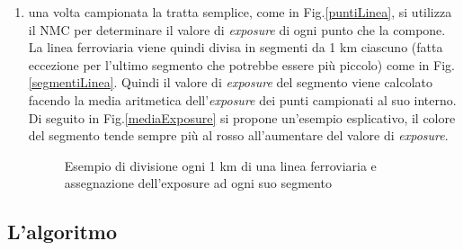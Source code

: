 \begin{enumerate}
\item una volta campionata la tratta semplice, come in Fig.\ref{puntiLinea}, si utilizza il NMC per determinare il valore di \textit{exposure} di ogni punto che la compone. \newline
La linea ferroviaria viene quindi divisa in segmenti da 1 km ciascuno (fatta eccezione per l'ultimo segmento che potrebbe essere più piccolo) come in Fig.\ref{segmentiLinea}. Quindi il valore di \textit{exposure}  del segmento viene calcolato facendo la media aritmetica dell'\textit{exposure} dei punti campionati al suo interno. Di seguito in Fig.\ref{mediaExposure}  si propone un'esempio esplicativo, il colore del segmento tende sempre più al rosso all'aumentare del valore di \textit{exposure}.

\begin{figure}[bth]
	\myfloatalign
	 \quad
	\caption[dove]{Esempio di divisione ogni 1 km di una linea ferroviaria e assegnazione dell'exposure  ad ogni suo segmento }
	\label{fig:divisioneLinea}
\end{figure}


\end{enumerate}




\subsection{L'algoritmo}